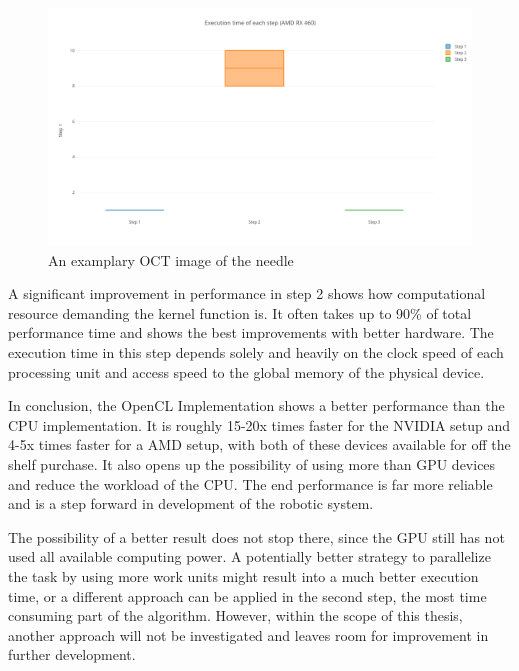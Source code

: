 \begin{figure}[H]
	\centering
	\includegraphics[width=14cm]{images/EachStepNVIDIA.png}
	\caption{An examplary OCT image of the needle}
	\label{ExampleOCTImage}
\end{figure}

A significant improvement in performance in step 2 shows how computational resource demanding the kernel function is. It often takes up to 90\% of total performance time and shows the best improvements with better hardware. The execution time in this step depends solely and heavily on the clock speed of each processing unit and access speed to the global memory of the physical device.

In conclusion, the OpenCL Implementation shows a better performance than the CPU implementation. It is roughly 15-20x times faster for the NVIDIA setup and 4-5x times faster for a AMD setup, with both of these devices available for off the shelf purchase. It also opens up the possibility of using more than GPU devices and reduce the workload of the CPU. The end performance is far more reliable and is a step forward in development of the robotic system. 

The possibility of a better result does not stop there, since the GPU still has not used all available computing power. A potentially better strategy to parallelize the task by using more work units might result into a much better execution time, or a different approach can be applied in the second step, the most time consuming part of the algorithm. However, within the scope of this thesis, another approach will not be investigated and leaves room for improvement in further development. 


